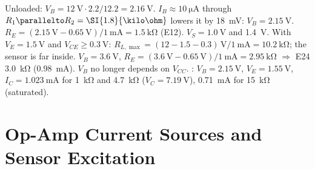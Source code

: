 \begin{solution}
\begin{talist}
\ta Unloaded: $V_B = \SI{12}{\volt}\cdot 2.2/12.2 = \SI{2.16}{\volt}$.
    $I_B \approx \SI{10}{\micro\ampere}$ through $R_1\parallelto R_2=\SI{1.8}{\kilo\ohm}$ lowers it by \SI{18}{\milli\volt}: $V_B=\SI{2.15}{\volt}$.
    $R_E = (\SI{2.15}{\volt}-\SI{0.65}{\volt})/\SI{1}{\milli\ampere} = \SI{1.5}{\kilo\ohm}$ (E12).
\ta $V_S = \SI{1.0}{\volt}$ and \SI{1.4}{\volt}. With $V_E = \SI{1.5}{\volt}$ and $V_{CE}\ge\SI{0.3}{\volt}$:
    $R_{L,\max} = (12-1.5-0.3)\,\si{\volt}/\SI{1}{\milli\ampere} = \SI{10.2}{\kilo\ohm}$; the sensor is far inside.
\ta $V_B = \SI{3.6}{\volt}$, $R_E = (\SI{3.6}{\volt}-\SI{0.65}{\volt})/\SI{1}{\milli\ampere} = \SI{2.95}{\kilo\ohm}$
    $\Rightarrow$ E24 \SI{3.0}{\kilo\ohm} (\SI{0.98}{\milli\ampere}). $V_B$ no longer depends on $V_{CC}$.
\ta {}: $V_B = \SI{2.15}{\volt}$, $V_E = \SI{1.55}{\volt}$,
    $I_C = \SI{1.023}{\milli\ampere}$ for \SI{1}{\kilo\ohm} and \SI{4.7}{\kilo\ohm} ($V_C = \SI{7.19}{\volt}$),
    \SI{0.71}{\milli\ampere} for \SI{15}{\kilo\ohm} (saturated).
\end{talist}
\end{solution}

\section{Op-Amp Current Sources and Sensor Excitation}

